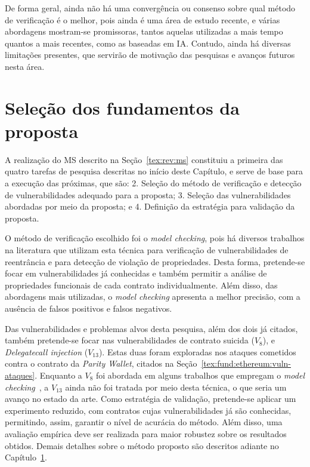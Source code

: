 De forma geral, ainda não há uma convergência ou consenso sobre qual método de verificação é o melhor, pois ainda é uma área de estudo recente, e várias abordagens mostram-se promissoras, tantos aquelas utilizadas a mais tempo quantos a mais recentes, como as baseadas em IA. Contudo, ainda há diversas limitações presentes, que servirão de motivação das pesquisas e avanços futuros nesta área.

\section{Seleção dos fundamentos da proposta}

A realização do MS descrito na Seção~\ref{tex:rev:ms} constituiu a primeira das quatro tarefas de pesquisa descritas no início deste Capítulo, e serve de base para a execução das próximas, que são: 2. Seleção do método de verificação e detecção de vulnerabilidades adequado para a proposta; 3. Seleção das vulnerabilidades abordadas por meio da proposta; e 4. Definição da estratégia para validação da proposta.

O método de verificação escolhido foi o \textit{model checking}, pois há diversos trabalhos na literatura que utilizam esta técnica para verificação de vulnerabilidades de reentrância e para detecção de violação de propriedades. Desta forma, pretende-se focar em vulnerabilidades já conhecidas e também permitir a análise de propriedades funcionais de cada contrato individualmente. Além disso, das abordagens mais utilizadas, o \textit{model checking} apresenta a melhor precisão, com a ausência de falsos positivos e falsos negativos.

Das vulnerabilidades e problemas alvos desta pesquisa, além dos dois já citados, também pretende-se focar nas vulnerabilidades de contrato suicida ($V_{8}$), e \textit{Delegatecall injection} ($V_{13}$). Estas duas foram exploradas nos ataques cometidos contra o contrato da \textit{Parity Wallet}, citados na Seção~\ref{tex:fund:ethereum:vuln-ataques}. Enquanto a $V_{8}$ foi abordada em alguns trabalhos que empregam o \textit{model checking}~\cite{frank2020ethbmc-32, nelaturu2020verified-101}, a $V_{13}$ ainda não foi tratada por meio desta técnica, o que seria um avanço no estado da arte. Como estratégia de validação, pretende-se aplicar um experimento reduzido, com contratos cujas vulnerabilidades já são conhecidas, permitindo, assim, garantir o nível de acurácia do método. Além disso, uma avaliação empírica deve ser realizada para maior robustez sobre os resultados obtidos. Demais detalhes sobre o método proposto são descritos adiante no Capítulo~\ref{}.